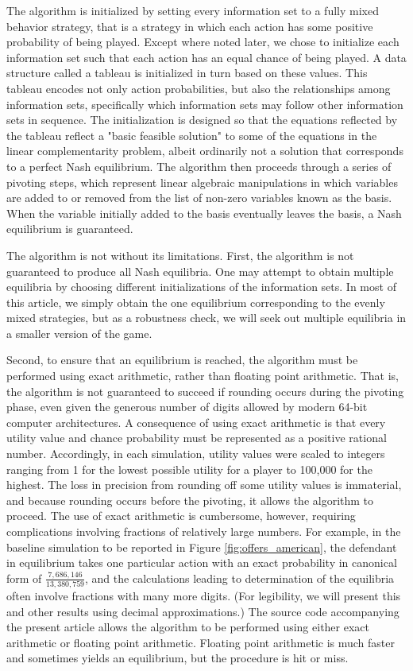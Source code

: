 \documentclass{article}
\begin{document}
The algorithm is initialized by setting every information set to a fully mixed behavior strategy, that is a strategy in which each action has some positive probability of being played. Except where noted later, we chose to initialize each information set such that each action has an equal chance of being played. A data structure called a tableau is initialized in turn based on these values. This tableau encodes not only action probabilities, but also the relationships among information sets, specifically which information sets may follow other information sets in sequence. The initialization is designed so that the equations reflected by the tableau reflect a "basic feasible solution" to some of the equations in the linear complementarity problem, albeit ordinarily not a solution that corresponds to a perfect Nash equilibrium.  The algorithm then proceeds through a series of pivoting steps, which represent  linear algebraic manipulations in which variables are added to or removed from the list of non-zero variables known as the basis. When the variable initially added to the basis eventually leaves the basis, a Nash equilibrium is guaranteed.

The algorithm is not without its limitations. First, the algorithm is not guaranteed to produce all Nash equilibria. One may attempt to obtain multiple equilibria by choosing different initializations of the information sets. In most of this article, we simply obtain the one equilibrium corresponding to the evenly mixed strategies, but as a robustness check, we will seek out multiple equilibria in a smaller version of the game. 

Second, to ensure that an equilibrium is reached, the algorithm must be performed using exact arithmetic, rather than floating point arithmetic. That is, the algorithm is not guaranteed to succeed if rounding occurs during the pivoting phase, even given the generous number of digits allowed by modern 64-bit computer architectures. A consequence of using exact arithmetic is that every utility value and chance probability must be represented as a positive rational number. Accordingly, in each simulation, utility values were scaled to integers ranging from 1 for the lowest possible utility for a player to 100,000 for the highest. The loss in precision from rounding off some utility values is immaterial, and because rounding occurs before the pivoting, it allows the algorithm to proceed. The use of exact arithmetic is cumbersome, however, requiring complications involving fractions of relatively large numbers. For example, in the baseline simulation to be reported in Figure \ref{fig:offers_american}, the defendant in equilibrium takes one particular action with an exact probability in canonical form of $\frac{7,686,146}{13,380,759}$, and the calculations leading to determination of the equilibria often involve fractions with many more digits. (For legibility, we will present this and other results using decimal approximations.) The source code accompanying the present article allows the algorithm to be performed using either exact arithmetic or floating point arithmetic. Floating point arithmetic is much faster and sometimes yields an equilibrium, but the procedure is hit or miss.
\end{document}
